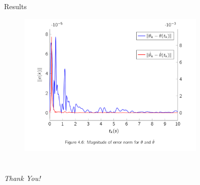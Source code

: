 \documentclass{beamer}
\begin{document}
\begin{frame}{Results}
  \begin{figure}[h]
    \centering
    \includegraphics[width=0.8\textwidth]{../Figures/ex2_err2.png}
  \end{figure}
  
\end{frame}

\section*{ }

\begin{frame}{}
  \centering
  \Large \emph{Thank You!}
  
\end{frame}
\end{document}
